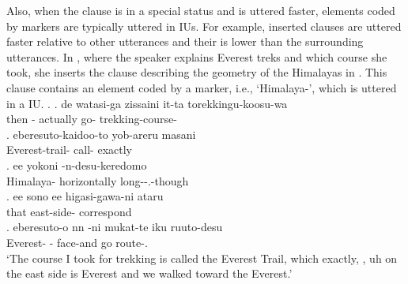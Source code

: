 Also,
when the clause is in a special status and is uttered faster,
elements coded by  markers are typically uttered in  IUs.
For example, inserted clauses are uttered faster relative to other utterances and their  is lower than the surrounding utterances.
In \Next, where the speaker explains Everest treks and which course she took,
she inserts the clause describing the geometry of the Himalayas in \Next[c].
This clause contains an element coded by a  marker, i.e.,  `Himalaya-',
which is uttered in a  IU.
%
\ex.\label{S01F0151_himaraya}
 \ag. de watasi-ga \tp{\dvline} zissaini \tp{\dvline} it-ta \tp{\dvline} torekkingu-koosu-wa \tp{\dvline} \\
 	then - {} actually {} go- {} trekking-course- {} \\
 \bg. eberesuto-kaidoo-to yob-areru \tp{\dvline} masani \tp{\dvline} \\
 	Everest-trail- call- {} exactly {} \\
 \bg. ee  yokoni -n-desu-keredomo \tp{\dvline} \\
 	 Himalaya- horizontally long--.-though {} \\
 \bg. ee sono \tp{\dvline} ee higasi-gawa-ni ataru \tp{\dvline} \\
 	 that {}  east-side- correspond {} \\
 \bg. eberesuto-o \tp{\dvline} nn -ni  mukat-te iku \tp{\dvline} ruuto-desu \\
 	Everest- {}  - face-and go {} route-. \\
	`The course I took for trekking is called the Everest Trail, which exactly, , uh on the east side is Everest and we walked toward the Everest.'

